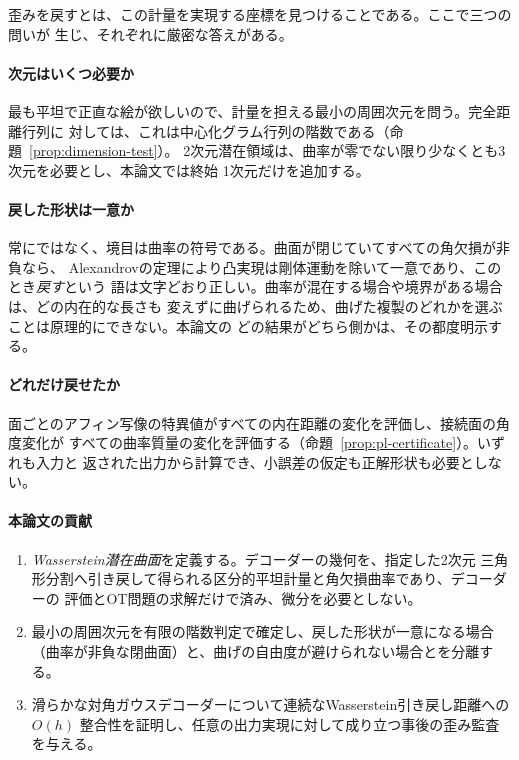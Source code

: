 歪みを戻すとは、この計量を実現する座標を見つけることである。ここで三つの問いが
生じ、それぞれに厳密な答えがある。

\paragraph{次元はいくつ必要か}
最も平坦で正直な絵が欲しいので、計量を担える最小の周囲次元を問う。完全距離行列に
対しては、これは中心化グラム行列の階数である（命題~\ref{prop:dimension-test}）。
2次元潜在領域は、曲率が零でない限り少なくとも3次元を必要とし、本論文では終始
1次元だけを追加する。

\paragraph{戻した形状は一意か}
常にではなく、境目は曲率の符号である。曲面が閉じていてすべての角欠損が非負なら、
Alexandrovの定理により凸実現は剛体運動を除いて一意であり、このとき\emph{戻す}という
語は文字どおり正しい。曲率が混在する場合や境界がある場合は、どの内在的な長さも
変えずに曲げられるため、曲げた複製のどれかを選ぶことは原理的にできない。本論文の
どの結果がどちら側かは、その都度明示する。

\paragraph{どれだけ戻せたか}
面ごとのアフィン写像の特異値がすべての内在距離の変化を評価し、接続面の角度変化が
すべての曲率質量の変化を評価する（命題~\ref{prop:pl-certificate}）。いずれも入力と
返された出力から計算でき、小誤差の仮定も正解形状も必要としない。

\paragraph{本論文の貢献}
\begin{enumerate}
  \item \emph{Wasserstein潜在曲面}を定義する。デコーダーの幾何を、指定した2次元
  三角形分割へ引き戻して得られる区分的平坦計量と角欠損曲率であり、デコーダーの
  評価とOT問題の求解だけで済み、微分を必要としない。
  \item 最小の周囲次元を有限の階数判定で確定し、戻した形状が一意になる場合
  （曲率が非負な閉曲面）と、曲げの自由度が避けられない場合とを分離する。
  \item 滑らかな対角ガウスデコーダーについて連続なWasserstein引き戻し距離への
  $O(h)$ 整合性を証明し、任意の出力実現に対して成り立つ事後の歪み監査を与える。
\end{enumerate}

